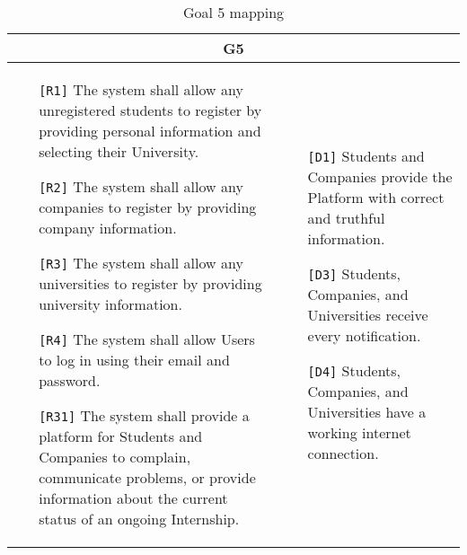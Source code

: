 \begin{table}[H]
    \centering
    \begin{tabular}{|p{8cm}|p{8cm}|}
         \hline
        \multicolumn{2}{|c|}{G5} \\
        \hline
        \begin{itemize}
            \item[\texttt{[R1]}] The system shall allow any unregistered students to register by providing personal information and selecting their University. 
            \item[\texttt{[R2]}] The system shall allow any companies to register by providing company information. 
            \item[\texttt{[R3]}] The system shall allow any universities to register by providing university information. 
            \item[\texttt{[R4]}] The system shall allow Users to log in using their email and password. 
            \item[\texttt{[R31]}] The system shall provide a platform for Students and Companies to complain, communicate problems, or provide information about the current status of an ongoing Internship.
        \end{itemize} & 
        \begin{itemize}
            \item[\texttt{[D1]}] Students and Companies provide the Platform with correct and truthful information.
            \item[\texttt{[D3]}] Students, Companies, and Universities receive every notification.
            \item[\texttt{[D4]}] Students, Companies, and Universities have a working internet connection.
        \end{itemize} \\ \hline
    \end{tabular}
    \caption{Goal 5 mapping}
    \label{tab:G5}
\end{table}

